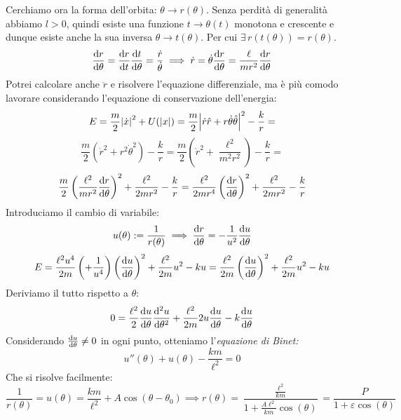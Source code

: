 Cerchiamo ora la forma dell'orbita: $\theta\rightarrow r(\theta)$. Senza perdità di generalità abbiamo $l>0$, 
quindi esiste una funzione $t\rightarrow\theta(t)$ monotona e crescente e dunque esiste anche la sua inversa $\theta\rightarrow t(\theta)$.
Per cui $\exists \,r(t(\theta))= r(\theta)$. 
\begin{equation}
    \dv{r}{\theta}=\dv{r}{t}\dv{t}{\theta}= \frac{\dot{r}}{\dot{\theta}}\implies \dot{r}= \dot{\theta}\dv{r}{\theta}= \frac{\ell}{mr^2}\dv{r}{\theta}
\end{equation}
Potrei calcolare anche $\ddot{r}$ e risolvere l'equazione differenziale, ma è più comodo lavorare considerando l'equazione di conservazione dell'energia:
\begin{equation*}
    E= \frac{m}{2}\abs{\dot{x}}^2 + U(\abs{x})= \frac{m}{2}\abs{\dot{r}\hat{r}+ r\dot{\theta}\hat{\theta}}^2-\frac{k}{r}=
\end{equation*}
\begin{equation*}
    \frac{m}{2}\left( \dot{r}^2 + r^2\dot{\theta}^2  \right)-\frac{k}{r}= \frac{m}{2}\left( \dot{r}^2 + \frac{\ell^2}{m^2r^2}\right)-\frac{k}{r}=
\end{equation*}
\begin{equation*}
    \frac{m}{2}\left( \frac{\ell^2}{mr^2}\dv{r}{\theta} \right)^2+ \frac{\ell^2}{2mr^2}-\frac{k}{r}= 
    \frac{\ell^2}{2mr^4}\left( \dv{r}{\theta} \right)^2+\frac{\ell^2}{2mr^2}-\frac{k}{r}
\end{equation*}
Introduciamo il cambio di variabile:
\begin{equation}
    u(\theta):= \frac{1}{r(\theta)}\implies \dv{r}{\theta}= -\frac{1}{u^2}\dv{u}{\theta}
\end{equation}
\begin{equation}
    E=\frac{\ell^2u^4}{2m}\left( +\frac{1}{u^4} \right)\left( \dv{u}{\theta} \right)^2+\frac{\ell^2}{2m}u^2-ku=
    \frac{\ell^2}{2m}\left( \dv{u}{\theta} \right)^2+\frac{\ell^2}{2m}u^2-ku
\end{equation}
Deriviamo il tutto rispetto a $\theta$:
\begin{equation}
    0 = \frac{\ell^2} 2\dv{u}{\theta}\dv[2]{u}{\theta}+\frac{\ell^2}{2m}2u\dv{u}{\theta} -k\dv{u}{\theta}
\end{equation}
Considerando $\dv{u}{\theta}\neq 0$ in ogni punto, otteniamo l'\textit{equazione di Binet:}
\begin{equation}
    u''(\theta)+u(\theta)- \frac{km}{\ell^2}=0
\end{equation}
Che si risolve facilmente:
\begin{equation}
    \frac{1}{r(\theta)}=u(\theta)= \frac{km}{\ell^2}+A\cos(\theta-\theta_0)\implies r(\theta)= 
    \frac{\frac{\ell^2}{km}}{1+\frac{A\ell^2}{km}\cos(\theta)}= \frac{P}{1+\varepsilon\cos(\theta)}
\end{equation}


